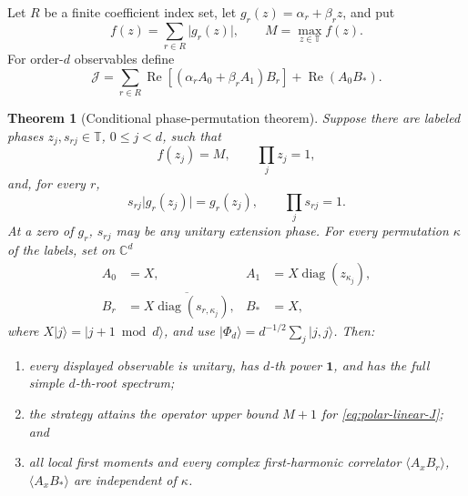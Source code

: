 \documentclass[11pt]{article}
\newtheorem{theorem}{Theorem}[section]
\theoremstyle{definition}
\theoremstyle{remark}
\newcommand{\Id}{\mathbf 1}
\newcommand{\cJ}{\mathcal J}
\newcommand{\Reop}{\operatorname{Re}}
\newcommand{\bbC}{\mathbb C}
\newcommand{\bbT}{\mathbb T}
\newcommand{\absop}[1]{\lvert #1\rvert}
\begin{document}
Let \(R\) be a finite coefficient index set, let
\(g_r(z)=\alpha_r+\beta_rz\), and put
\[
 f(z)=\sum_{r\in R}\absop{g_r(z)},
 \qquad M=\max_{z\in\bbT}f(z).
\]
For order-\(d\) observables define
\begin{equation}
 \cJ=\sum_{r\in R}\Reop\!\left[(\alpha_rA_0+\beta_rA_1)B_r\right]
 +\Reop(A_0B_*).
 \label{eq:polar-linear-J}
\end{equation}

\begin{theorem}[Conditional phase-permutation theorem]
\label{thm:permutation}
Suppose there are labeled phases \(z_j,s_{rj}\in\bbT\),
\(0\leq j<d\), such that
\[
 f(z_j)=M,\qquad \prod_jz_j=1,
\]
and, for every \(r\),
\[
 s_{rj}\absop{g_r(z_j)}=g_r(z_j),
 \qquad \prod_js_{rj}=1.
\]
At a zero of \(g_r\), \(s_{rj}\) may be any unitary extension phase.
For every permutation \(\kappa\) of the labels, set on \(\bbC^d\)
\begin{equation}
\begin{aligned}
 A_0&=X,&
 A_1&=X\operatorname{diag}(z_{\kappa_j}),\\
 B_r&=\overline{X\operatorname{diag}(s_{r,\kappa_j})},&
 B_*&=X,
\end{aligned}
\label{eq:permutation-strategy}
\end{equation}
where \(X\lvert j\rangle=\lvert j+1\bmod d\rangle\), and use
\(\lvert\Phi_d\rangle=d^{-1/2}\sum_j\lvert j,j\rangle\).
Then:
\begin{enumerate}[label=(\roman*),leftmargin=1.7em]
\item every displayed observable is unitary, has \(d\)-th power \(\Id\),
and has the full simple \(d\)-th-root spectrum;
\item the strategy attains the operator upper bound \(M+1\) for
\eqref{eq:polar-linear-J}; and
\item all local first moments and every complex first-harmonic correlator
\(\langle A_xB_r\rangle\), \(\langle A_xB_*\rangle\) are independent of
\(\kappa\).
\end{enumerate}
\end{theorem}
\end{document}
